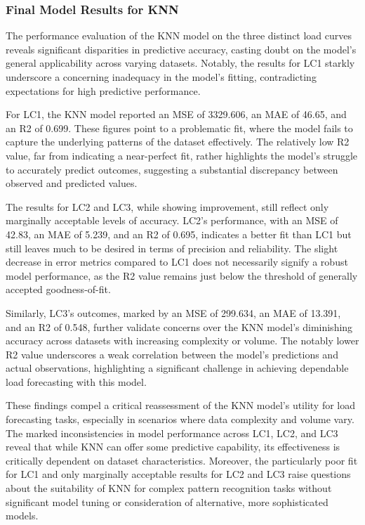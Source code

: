 \documentclass{article} %
\begin{document}
\subsubsection{Final Model Results for KNN}
The performance evaluation of the KNN model on the three distinct load curves reveals significant disparities in predictive accuracy, casting doubt on the model's general applicability across varying datasets. Notably, the results for LC1 starkly underscore a concerning inadequacy in the model's fitting, contradicting expectations for high predictive performance.

For LC1, the KNN model reported an MSE of 3329.606, an MAE of 46.65, and an R2 of 0.699. These figures point to a problematic fit, where the model fails to capture the underlying patterns of the dataset effectively. The relatively low R2 value, far from indicating a near-perfect fit, rather highlights the model's struggle to accurately predict outcomes, suggesting a substantial discrepancy between observed and predicted values.

The results for LC2 and LC3, while showing improvement, still reflect only marginally acceptable levels of accuracy. LC2's performance, with an MSE of 42.83, an MAE of 5.239, and an R2 of 0.695, indicates a better fit than LC1 but still leaves much to be desired in terms of precision and reliability. The slight decrease in error metrics compared to LC1 does not necessarily signify a robust model performance, as the R2 value remains just below the threshold of generally accepted goodness-of-fit.

Similarly, LC3's outcomes, marked by an MSE of 299.634, an MAE of 13.391, and an R2 of 0.548, further validate concerns over the KNN model's diminishing accuracy across datasets with increasing complexity or volume. The notably lower R2 value underscores a weak correlation between the model's predictions and actual observations, highlighting a significant challenge in achieving dependable load forecasting with this model.

These findings compel a critical reassessment of the KNN model's utility for load forecasting tasks, especially in scenarios where data complexity and volume vary. The marked inconsistencies in model performance across LC1, LC2, and LC3 reveal that while KNN can offer some predictive capability, its effectiveness is critically dependent on dataset characteristics. Moreover, the particularly poor fit for LC1 and only marginally acceptable results for LC2 and LC3 raise questions about the suitability of KNN for complex pattern recognition tasks without significant model tuning or consideration of alternative, more sophisticated models.
\end{document}
